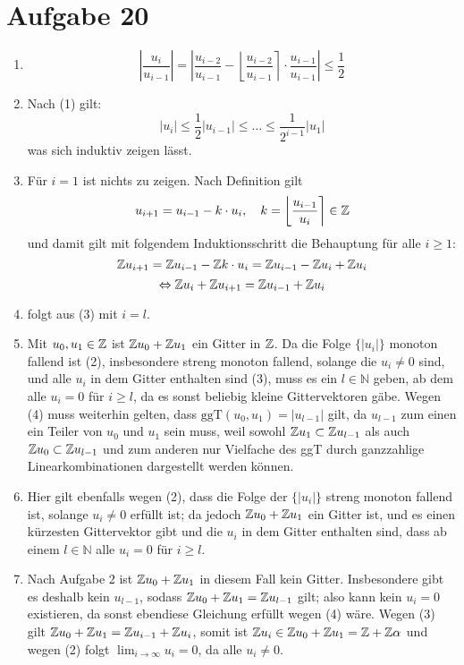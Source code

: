 \section*{Aufgabe 20}
\begin{enumerate}[(1)]
	\item \[ \left\vert \frac{u_i}{u_{i-1}} \right\vert = \left\vert
	\frac{u_{i-2}}{u_{i-1}} - \left\lfloor \frac{u_{i-2}}{u_{i-1}}
	\right\rceil \cdot \frac{u_{i-1}}{u_{i-1}} \right\vert \leq \frac{1}{2}\]
	
	\item Nach (1) gilt: \[ \vert u_i \vert \leq \frac{1}{2} \vert u_{i-1}
	\vert \leq \dots \leq \frac{1}{2^{i-1}} \vert u_1 \vert \]
	was sich induktiv zeigen lässt.
	
	\item Für $i = 1$ ist nichts zu zeigen. Nach Definition gilt
	\[ u_{i+1} = u_{i-1} - k\cdot u_i,\quad k = \left\lfloor
	\frac{u_{i-1}}{u_i} \right\rceil \in \mathbb{Z} \]
	und damit gilt mit folgendem Induktionsschritt die Behauptung für alle
	$i \geq 1$:
	\[ \mathbb{Z} u_{i+1} = \mathbb{Z} u_{i-1} - \mathbb{Z} k\cdot u_i = \mathbb{Z} u_{i-1} - \mathbb{Z} u_i + \mathbb{Z} u_i \]
	\[ \Leftrightarrow \mathbb{Z} u_i + \mathbb{Z} u_{i+1} = \mathbb{Z} u_{i-1} + \mathbb{Z} u_i \]
	
	\item folgt aus (3) mit $i = l$.
	
	\item Mit $u_0, u_1 \in \mathbb{Z}$ ist $\mathbb{Z} u_0 + \mathbb{Z} u_1$ ein Gitter in $\mathbb{Z}$.
	Da die Folge $\{|u_i|\}$ monoton fallend ist (2), insbesondere streng
	monoton fallend, solange die $u_i \neq 0$ sind, und alle $u_i$ in dem
	Gitter enthalten sind (3), muss es ein $l \in \mathbb{N}$ geben, ab dem
	alle $u_i = 0$ für $i \geq l$, da es sonst beliebig kleine Gittervektoren
	gäbe. Wegen (4) muss weiterhin gelten, dass $\text{ggT}(u_0, u_1) =
	|u_{l-1}|$ gilt, da $u_{l-1}$ zum einen ein Teiler von $u_0$ und $u_1$
	sein muss, weil sowohl $\mathbb{Z} u_1 \subset  \mathbb{Z} u_{l-1}$ als auch $\mathbb{Z} u_0
	\subset \mathbb{Z} u_{l-1}$ und zum anderen nur Vielfache des ggT durch
	ganzzahlige Linearkombinationen dargestellt werden können. 

	\item Hier gilt ebenfalls wegen (2), dass die Folge der $\{|u_i|\}$
	streng monoton fallend ist, solange $u_i \neq 0$ erfüllt ist; da jedoch
	$\mathbb{Z} u_0 + \mathbb{Z} u_1$ ein Gitter ist, und es einen kürzesten Gittervektor
	gibt und die $u_i$ in dem Gitter enthalten sind, dass ab einem $l \in
	\mathbb{N}$ alle $u_i = 0$ für $i \geq l$.

	\item Nach Aufgabe 2 ist $\mathbb{Z} u_0 + \mathbb{Z} u_1$ in diesem Fall kein Gitter.
	Insbesondere gibt es deshalb kein $u_{l-1}$, sodass $\mathbb{Z} u_0 + \mathbb{Z} u_1 =
	\mathbb{Z} u_{l-1}$ gilt; also kann kein $u_i = 0$ existieren, da sonst
	ebendiese Gleichung erfüllt wegen (4) wäre. Wegen (3) gilt $\mathbb{Z} u_0 + \mathbb{Z} u_1 = \mathbb{Z}
	u_{i-1} + \mathbb{Z} u_i $, somit ist $\mathbb{Z} u_i \in \mathbb{Z} u_0 + \mathbb{Z} u_1 = \mathbb{Z} + \mathbb{Z}
	\alpha$ und wegen (2) folgt $\lim_{i \rightarrow \infty} u_i = 0$, da
	alle $u_i \neq 0$.


\end{enumerate}
